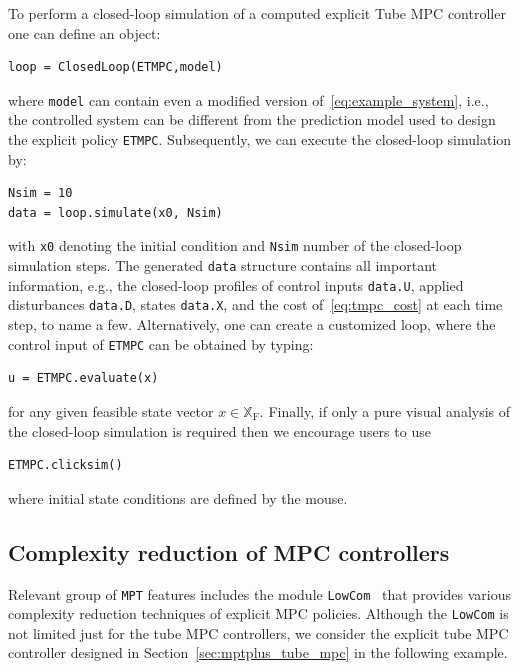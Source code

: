 \documentclass[letterpaper, 10 pt, conference]{ieeeconf}
\begin{document}
To perform a closed-loop simulation of a computed explicit Tube MPC controller one can define an object:
\begin{lstlisting}[style=Matlab-editor]
loop = ClosedLoop(ETMPC,model)
\end{lstlisting}
where \verb|model| can contain even a modified version of~\eqref{eq:example_system}, i.e., the controlled system can be different from the prediction model used to design the explicit policy \verb|ETMPC|. Subsequently, we can execute the closed-loop simulation by:
\begin{lstlisting}[style=Matlab-editor]
Nsim = 10
data = loop.simulate(x0, Nsim)
\end{lstlisting}	
with \verb|x0| denoting the initial condition and \verb|Nsim| number of the closed-loop simulation steps. The generated \verb|data| structure contains all important information, e.g., the closed-loop profiles of control inputs \verb|data.U|, applied disturbances \verb|data.D|, states \verb|data.X|, and the cost of~\eqref{eq:tmpc_cost} at each time step, to name a few.
Alternatively, one can create a customized loop, where the control input of \verb|ETMPC| can be obtained by typing: 
\begin{lstlisting}[style=Matlab-editor]
u = ETMPC.evaluate(x)
\end{lstlisting}
for any given feasible state vector $x\in\mathbb{X}_{\mathrm{F}}$.
%
Finally, if only a pure visual analysis of the closed-loop simulation is required then we encourage users to use
\begin{lstlisting}[style=Matlab-editor]
ETMPC.clicksim()
\end{lstlisting}
where initial state conditions are defined by the mouse.
%

\subsection{Complexity reduction of MPC controllers}
\label{sec:code_mpt3lowcom}

Relevant group of \texttt{MPT} features includes the module \texttt{LowCom}~\cite{KH15} that provides various complexity reduction techniques of explicit MPC policies. Although the \texttt{LowCom} is not limited just for the tube MPC controllers, we consider the explicit tube MPC controller designed in Section~\ref{sec:mptplus_tube_mpc} in the following example.
\end{document}
